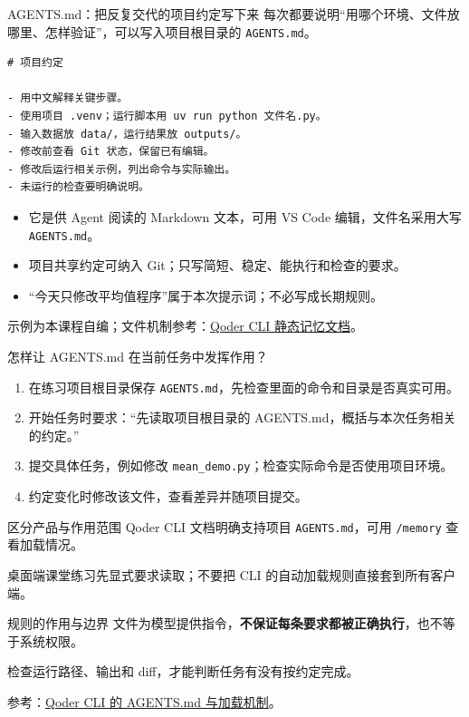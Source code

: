 \documentclass[9pt]{ctexbeamer}
\begin{document}
\begin{frame}[fragile]{AGENTS.md：把反复交代的项目约定写下来}
  每次都要说明“用哪个环境、文件放哪里、怎样验证”，可以写入项目根目录的 \texttt{AGENTS.md}。
\begin{lstlisting}[language={},numbers=none,basicstyle=\ttfamily\small]
# 项目约定

- 用中文解释关键步骤。
- 使用项目 .venv；运行脚本用 uv run python 文件名.py。
- 输入数据放 data/，运行结果放 outputs/。
- 修改前查看 Git 状态，保留已有编辑。
- 修改后运行相关示例，列出命令与实际输出。
- 未运行的检查要明确说明。
\end{lstlisting}
  \begin{itemize}
    \item 它是供 Agent 阅读的 Markdown 文本，可用 VS Code 编辑，文件名采用大写 \texttt{AGENTS.md}。
    \item 项目共享约定可纳入 Git；只写简短、稳定、能执行和检查的要求。
    \item “今天只修改平均值程序”属于本次提示词；不必写成长期规则。
  \end{itemize}
  {\tiny 示例为本课程自编；文件机制参考：\href{https://docs.qoder.cn/cli/memory}{Qoder CLI 静态记忆文档}。}
\end{frame}

\begin{frame}{怎样让 AGENTS.md 在当前任务中发挥作用？}
  \begin{enumerate}
    \item 在练习项目根目录保存 \texttt{AGENTS.md}，先检查里面的命令和目录是否真实可用。
    \item 开始任务时要求：“先读取项目根目录的 AGENTS.md，概括与本次任务相关的约定。”
    \item 提交具体任务，例如修改 \texttt{mean\_demo.py}；检查实际命令是否使用项目环境。
    \item 约定变化时修改该文件，查看差异并随项目提交。
  \end{enumerate}
  \begin{block}{区分产品与作用范围}
    Qoder CLI 文档明确支持项目 \texttt{AGENTS.md}，可用 \texttt{/memory} 查看加载情况。\par
    桌面端课堂练习先显式要求读取；不要把 CLI 的自动加载规则直接套到所有客户端。
  \end{block}
  \begin{block}{规则的作用与边界}
    文件为模型提供指令，\textbf{不保证每条要求都被正确执行}，也不等于系统权限。\par
    检查运行路径、输出和 diff，才能判断任务有没有按约定完成。
  \end{block}
  {\tiny 参考：\href{https://docs.qoder.cn/cli/memory}{Qoder CLI 的 AGENTS.md 与加载机制}。}
\end{frame}
\end{document}
